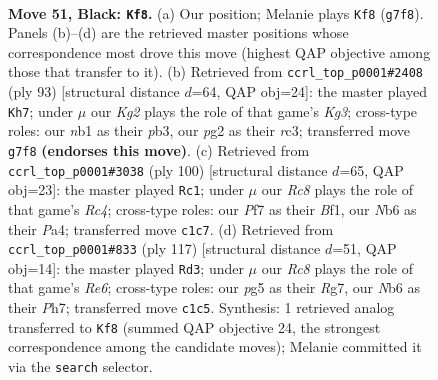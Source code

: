 \documentclass[11pt]{article}
\begin{document}
\clearpage

\begin{figure}[p]\centering
\begin{subfigure}{0.46\textwidth}\centering
\resizebox{\linewidth}{!}{%
\newchessgame
\chessboard[
  setfen={8/5pkp/1n4p1/p3p1P1/P3P3/1P4RP/4K1P1/RNr4r b - - 17 51},
  showmover=false,
  pgfstyle=straightmove, color=movearrow, markmove={g7-f8}
]}
\caption{}
\end{subfigure}\hfill
\begin{subfigure}{0.46\textwidth}\centering
\resizebox{\linewidth}{!}{%
\newchessgame
\chessboard[
  setfen={1r6/6p1/5pk1/4pn1p/1r5P/1PR3P1/1R1N1PK1/8 b - - 36 47},
  showmover=false,
  pgfstyle=straightmove, color=movearrow, markmove={g6-h7}
]}
\caption{}
\end{subfigure}
\\[4pt]
\begin{subfigure}{0.46\textwidth}\centering
\resizebox{\linewidth}{!}{%
\newchessgame
\chessboard[
  setfen={4r3/1p2r2p/2p4k/p1P1Pp1P/PnRP4/5K2/4R3/5B2 w - - 1 51},
  showmover=false,
  pgfstyle=straightmove, color=movearrow, markmove={c4-c1}
]}
\caption{}
\end{subfigure}\hfill
\begin{subfigure}{0.46\textwidth}\centering
\resizebox{\linewidth}{!}{%
\newchessgame
\chessboard[
  setfen={5k2/2p3rp/1p1p1n2/p7/2P2p2/1PN1rP1P/P1R3P1/6RK b - - 4 59},
  showmover=false,
  pgfstyle=straightmove, color=movearrow, markmove={e3-d3}
]}
\caption{}
\end{subfigure}
\caption{\textbf{Move 51, Black: \texttt{Kf8}.} (a) Our position; Melanie plays \texttt{Kf8} (\texttt{g7f8}). Panels (b)--(d) are the retrieved master positions whose correspondence most drove this move (highest QAP objective among those that transfer to it). (b) Retrieved from \texttt{ccrl\_top\_p0001\#2408} (ply 93) [structural distance $d$=64, QAP obj=24]: the master played \texttt{Kh7}; under $\mu$ our \emph{Kg2} plays the role of that game's \emph{Kg3}; cross-type roles: our \emph{n}b1 as their \emph{p}b3, our \emph{p}g2 as their \emph{r}c3; transferred move \texttt{g7f8} \textbf{(endorses this move)}. (c) Retrieved from \texttt{ccrl\_top\_p0001\#3038} (ply 100) [structural distance $d$=65, QAP obj=23]: the master played \texttt{Rc1}; under $\mu$ our \emph{Rc8} plays the role of that game's \emph{Rc4}; cross-type roles: our \emph{P}f7 as their \emph{B}f1, our \emph{N}b6 as their \emph{P}a4; transferred move \texttt{c1c7}. (d) Retrieved from \texttt{ccrl\_top\_p0001\#833} (ply 117) [structural distance $d$=51, QAP obj=14]: the master played \texttt{Rd3}; under $\mu$ our \emph{Rc8} plays the role of that game's \emph{Re6}; cross-type roles: our \emph{p}g5 as their \emph{R}g7, our \emph{N}b6 as their \emph{P}h7; transferred move \texttt{c1c5}. Synthesis: 1 retrieved analog transferred to \texttt{Kf8} (summed QAP objective 24, the strongest correspondence among the candidate moves); Melanie committed it via the \texttt{search} selector.}
\label{fig:thought-m101}
\end{figure}
\end{document}

